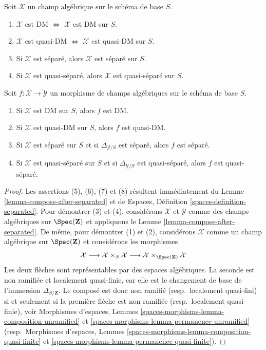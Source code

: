 \begin{lemma}
\label{lemma-separated-implies-morphism-separated}
Soit $\mathcal{X}$ un champ algébrique sur le schéma de base $S$.
\begin{enumerate}
\item
$\mathcal{X}$ est DM $\Leftrightarrow$
$\mathcal{X}$ est DM sur $S$.
\item
$\mathcal{X}$ est quasi-DM $\Leftrightarrow$
$\mathcal{X}$ est quasi-DM sur $S$.
\item Si $\mathcal{X}$ est séparé, alors $\mathcal{X}$ est séparé sur $S$.
\item Si $\mathcal{X}$ est quasi-séparé, alors $\mathcal{X}$ est quasi-séparé
sur $S$.
\end{enumerate}
Soit $f : \mathcal{X} \to \mathcal{Y}$ un morphisme de champs algébriques
sur le schéma de base $S$.
\begin{enumerate}
\item[(5)] Si $\mathcal{X}$ est DM sur $S$, alors $f$ est DM.
\item[(6)] Si $\mathcal{X}$ est quasi-DM sur $S$, alors $f$ est quasi-DM.
\item[(7)] Si $\mathcal{X}$ est séparé sur $S$ et si
$\Delta_{\mathcal{Y}/S}$ est séparé, alors $f$ est séparé.
\item[(8)] Si $\mathcal{X}$ est quasi-séparé sur $S$ et si
$\Delta_{\mathcal{Y}/S}$ est quasi-séparé, alors $f$ est quasi-séparé.
\end{enumerate}
\end{lemma}

\begin{proof}
Les assertions (5), (6), (7) et (8) résultent immédiatement du Lemme
\ref{lemma-compose-after-separated} et de Espaces, Définition
\ref{spaces-definition-separated}. Pour démontrer (3) et (4), considérons
$\mathcal{X}$ et $\mathcal{Y}$ comme des champs algébriques sur
$\Spec(\mathbf{Z})$ et appliquons le Lemme
\ref{lemma-compose-after-separated}. De même, pour démontrer (1) et (2),
considérons $\mathcal{X}$ comme un champ algébrique sur
$\Spec(\mathbf{Z})$ et considérons les morphismes
$$
\mathcal{X} \longrightarrow
\mathcal{X} \times_S \mathcal{X} \longrightarrow
\mathcal{X} \times_{\Spec(\mathbf{Z})} \mathcal{X}
$$
Les deux flèches sont représentables par des espaces algébriques. La seconde
est non ramifiée et localement quasi-finie, car elle est le changement de base
de l'immersion $\Delta_{S/\mathbf{Z}}$. Le composé est donc non ramifié
(resp.\ localement quasi-fini) si et seulement si la première flèche est non
ramifiée (resp.\ localement quasi-finie), voir Morphismes d'espaces, Lemmes
\ref{spaces-morphisms-lemma-composition-unramified} et
\ref{spaces-morphisms-lemma-permanence-unramified}
(resp.\ Morphismes d'espaces, Lemmes
\ref{spaces-morphisms-lemma-composition-quasi-finite} et
\ref{spaces-morphisms-lemma-permanence-quasi-finite}).
\end{proof}

